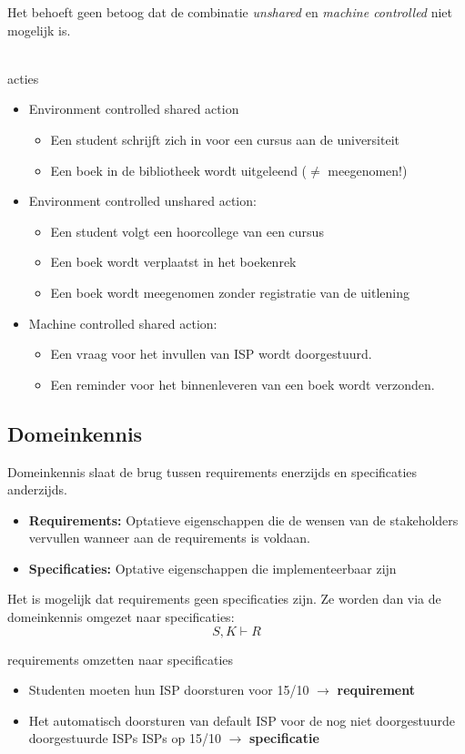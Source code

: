 \documentclass[../../main.tex]{subfiles}
\begin{document}
Het behoeft geen betoog dat de combinatie \textit{unshared} en \textit{machine controlled} niet mogelijk is. \\
\\
\begin{ex}{acties}
\begin{itemize}
	\item Environment controlled shared action
	\begin{itemize}
		\item Een student schrijft zich in voor een cursus aan de universiteit
		\item Een boek in de bibliotheek wordt uitgeleend ($\neq$ meegenomen!)
	\end{itemize}
	\item Environment controlled unshared action:
	\begin{itemize}
		\item Een student volgt een hoorcollege van een cursus
		\item Een boek wordt verplaatst in het boekenrek
		\item Een boek wordt meegenomen zonder registratie van de uitlening
	\end{itemize}
	\item Machine controlled shared action:
	\begin{itemize}
		\item Een vraag voor het invullen van ISP wordt doorgestuurd.
		\item Een reminder voor het binnenleveren van een boek wordt verzonden.
	\end{itemize}
\end{itemize}
\end{ex}

\subsection{Domeinkennis}
Domeinkennis slaat de brug tussen requirements enerzijds en specificaties anderzijds.
\begin{itemize}
	\item \textbf{Requirements:} Optatieve eigenschappen die de wensen van de stakeholders vervullen wanneer aan de requirements is voldaan.
	\item \textbf{Specificaties:} Optative eigenschappen die implementeerbaar zijn
\end{itemize}
Het is mogelijk dat requirements geen specificaties zijn. Ze worden dan via de domeinkennis omgezet naar specificaties:
\begin{equation*}
\boxed{S,K \vdash R}
\end{equation*}
\begin{ex}{requirements omzetten naar specificaties}
\begin{itemize}
	\item Studenten moeten hun ISP doorsturen voor 15/10 $\rightarrow$ \textbf{requirement}
	\item Het automatisch doorsturen van default ISP voor de nog niet
doorgestuurde  doorgestuurde ISPs ISPs op 15/10 $\rightarrow$ \textbf{specificatie}
\end{itemize}
\end{ex}
\end{document}
